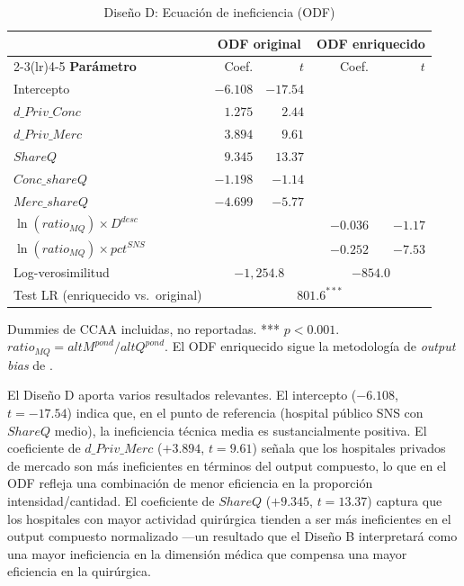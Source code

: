 \begin{table}[htbp]
\centering
\caption{Diseño D: Ecuación de ineficiencia (ODF)}
\label{tab:odf}
\begin{threeparttable}
\begin{tabular}{lrrrr}
\toprule
& \multicolumn{2}{c}{\textbf{ODF original}}
& \multicolumn{2}{c}{\textbf{ODF enriquecido}} \\
\cmidrule(lr){2-3}\cmidrule(lr){4-5}
\textbf{Parámetro} & Coef. & $t$ & Coef. & $t$ \\
\midrule
Intercepto & $-6.108$ & $-17.54$ & & \\
$d\_Priv\_Conc$ & $1.275$ & $2.44$ & & \\
$d\_Priv\_Merc$ & $3.894$ & $9.61$ & & \\
$ShareQ$ & $9.345$ & $13.37$ & & \\
$Conc\_shareQ$ & $-1.198$ & $-1.14$ & & \\
$Merc\_shareQ$ & $-4.699$ & $-5.77$ & & \\
$\ln(ratio_{MQ}) \times D^{desc}$ & & & $-0.036$ & $-1.17$ \\
$\ln(ratio_{MQ}) \times pct^{SNS}$ & & & $-0.252$ & $-7.53$ \\
\midrule
Log-verosimilitud & \multicolumn{2}{c}{$-1{,}254.8$}
  & \multicolumn{2}{c}{$-854.0$} \\
Test LR (enriquecido vs.\ original) & \multicolumn{4}{c}{$801.6^{***}$} \\
\bottomrule
\end{tabular}
\begin{tablenotes}
  \small
  \item Dummies de CCAA incluidas, no reportadas. *** $p<0.001$. $ratio_{MQ} = altM^{pond}/altQ^{pond}$. El ODF enriquecido sigue la metodología de \textit{output bias} de \citet{kumbhakar2015}.
\end{tablenotes}
\end{threeparttable}
\end{table}

El Diseño D aporta varios resultados relevantes. El intercepto ($-6.108$, $t=-17.54$) indica que, en el punto de referencia (hospital público SNS con $ShareQ$ medio), la ineficiencia técnica media es sustancialmente positiva. El coeficiente de $d\_Priv\_Merc$ ($+3.894$, $t=9.61$) señala que los hospitales privados de mercado son más ineficientes en términos del output compuesto, lo que en el ODF refleja una combinación de menor eficiencia en la proporción intensidad/cantidad. El coeficiente de $ShareQ$ ($+9.345$, $t=13.37$) captura que los hospitales con mayor actividad quirúrgica tienden a ser más ineficientes en el output compuesto normalizado ---un resultado que el Diseño B interpretará como una mayor ineficiencia en la dimensión médica que compensa una mayor eficiencia en la quirúrgica.

